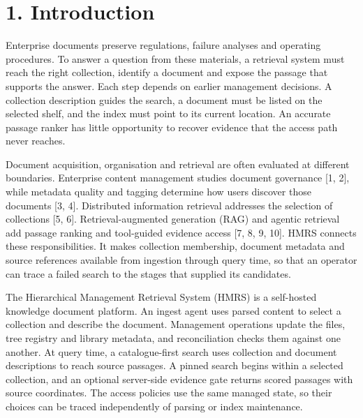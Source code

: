 \section{1. Introduction}


Enterprise documents preserve regulations, failure analyses and operating
procedures. To answer a question from these materials, a retrieval system
must reach the right collection, identify a document and expose the passage
that supports the answer. Each step depends on earlier management decisions.
A collection description guides the search, a document must be listed on
the selected shelf, and the index must point to its current location.
An accurate passage ranker has little opportunity to recover evidence that
the access path never reaches.

Document acquisition, organisation and retrieval are often evaluated at
different boundaries. Enterprise content management studies document
governance [1, 2], while metadata
quality and tagging determine how users discover those documents
[3, 4]. Distributed
information retrieval addresses the selection of collections
[5, 6]. Retrieval-augmented generation
(RAG) and agentic retrieval add passage ranking and tool-guided evidence
access [7, 8, 9, 10].
HMRS connects these responsibilities. It makes collection membership,
document metadata and source references available from ingestion through
query time, so that an operator can trace a failed search to the stages
that supplied its candidates.

The Hierarchical Management Retrieval System (HMRS) is a self-hosted
knowledge document platform. An ingest agent uses parsed content to select
a collection and describe the document. Management operations update the
files, tree registry and library metadata, and reconciliation checks them
against one another. At query time, a catalogue-first search uses collection
and document descriptions to reach source passages. A pinned search begins
within a selected collection, and an optional server-side evidence gate
returns scored passages with source coordinates. The access policies use the
same managed state, so their choices can be traced independently of parsing
or index maintenance.

